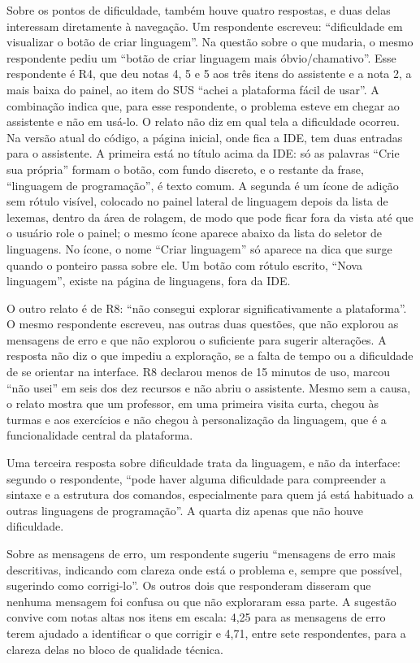 Sobre os pontos de dificuldade, também houve quatro respostas, e duas delas interessam diretamente à navegação. Um respondente escreveu: ``dificuldade em visualizar o botão de criar linguagem''. Na questão sobre o que mudaria, o mesmo respondente pediu um ``botão de criar linguagem mais óbvio/chamativo''. Esse respondente é R4, que deu notas 4, 5 e 5 aos três itens do assistente e a nota 2, a mais baixa do painel, ao item do SUS ``achei a plataforma fácil de usar''. A combinação indica que, para esse respondente, o problema esteve em chegar ao assistente e não em usá-lo. O relato não diz em qual tela a dificuldade ocorreu. Na versão atual do código, a página inicial, onde fica a IDE, tem duas entradas para o assistente. A primeira está no título acima da IDE: só as palavras ``Crie sua própria'' formam o botão, com fundo discreto, e o restante da frase, ``linguagem de programação'', é texto comum. A segunda é um ícone de adição sem rótulo visível, colocado no painel lateral de linguagem depois da lista de lexemas, dentro da área de rolagem, de modo que pode ficar fora da vista até que o usuário role o painel; o mesmo ícone aparece abaixo da lista do seletor de linguagens. No ícone, o nome ``Criar linguagem'' só aparece na dica que surge quando o ponteiro passa sobre ele. Um botão com rótulo escrito, ``Nova linguagem'', existe na página de linguagens, fora da IDE.

O outro relato é de R8: ``não consegui explorar significativamente a plataforma''. O mesmo respondente escreveu, nas outras duas questões, que não explorou as mensagens de erro e que não explorou o suficiente para sugerir alterações. A resposta não diz o que impediu a exploração, se a falta de tempo ou a dificuldade de se orientar na interface. R8 declarou menos de 15 minutos de uso, marcou ``não usei'' em seis dos dez recursos e não abriu o assistente. Mesmo sem a causa, o relato mostra que um professor, em uma primeira visita curta, chegou às turmas e aos exercícios e não chegou à personalização da linguagem, que é a funcionalidade central da plataforma.

Uma terceira resposta sobre dificuldade trata da linguagem, e não da interface: segundo o respondente, ``pode haver alguma dificuldade para compreender a sintaxe e a estrutura dos comandos, especialmente para quem já está habituado a outras linguagens de programação''. A quarta diz apenas que não houve dificuldade.

Sobre as mensagens de erro, um respondente sugeriu ``mensagens de erro mais descritivas, indicando com clareza onde está o problema e, sempre que possível, sugerindo como corrigi-lo''. Os outros dois que responderam disseram que nenhuma mensagem foi confusa ou que não exploraram essa parte. A sugestão convive com notas altas nos itens em escala: 4,25 para as mensagens de erro terem ajudado a identificar o que corrigir e 4,71, entre sete respondentes, para a clareza delas no bloco de qualidade técnica.

